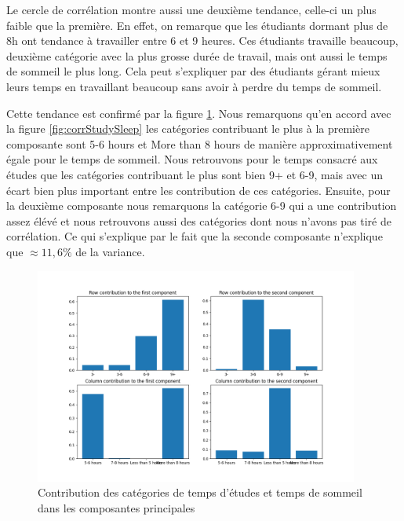 Le cercle de corrélation montre aussi une deuxième tendance, celle-ci un plus faible que la première.
En effet, on remarque que les étudiants dormant plus de 8h ont tendance à travailler entre 6 et 9 heures.
Ces étudiants travaille beaucoup, deuxième catégorie avec la plus grosse durée de travail, mais ont aussi le temps de sommeil le plus long.
Cela peut s'expliquer par des étudiants gérant mieux leurs temps en travaillant beaucoup sans avoir à perdre du temps de sommeil.


Cette tendance est confirmé par la figure \ref{fig:contribStudySleep}.
Nous remarquons qu'en accord avec la figure \ref{fig:corrStudySleep} les catégories contribuant le plus à la première composante sont 5-6 hours et More than 8 hours de manière approximativement égale pour le temps de sommeil.
Nous retrouvons pour le temps consacré aux études que les catégories contribuant le plus sont bien 9+ et 6-9, mais avec un écart bien plus important entre les contribution de ces catégories.
Ensuite, pour la deuxième composante nous remarquons la catégorie 6-9 qui a une contribution assez élévé et nous retrouvons aussi des catégories dont nous n'avons pas tiré de corrélation.
Ce qui s'explique par le fait que la seconde composante n'explique que $\approx11,6\%$ de la variance.

\begin{figure}[H]
    \begin{center}
      \includegraphics[width=0.95\textwidth]{Images/Study_Sleep_all/RowColumnsContributions.png}
    \end{center}
    \caption{Contribution des catégories de temps d'études et temps de sommeil dans les composantes principales}
    \label{fig:contribStudySleep}
  \end{figure}




